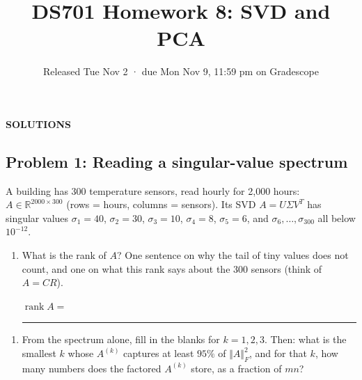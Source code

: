 \documentclass[
  11pt,
]{article}
\title{DS701 Homework 8: SVD and PCA}
\subtitle{Released Tue Nov 2 · due Mon Nov 9, 11:59 pm on Gradescope}
\author{}
\date{}
\providecommand{\tightlist}{%
  \setlength{\itemsep}{0pt}\setlength{\parskip}{0pt}}
\newcommand{\answerspace}[1]{\par\vspace*{#1}}  %
\newcommand{\blank}[1][1.2in]{\rule{#1}{0.4pt}}
\newcommand{\answerpage}{\clearpage}
\begin{document}
\maketitle


\begin{center}\LARGE\bfseries\color{blue!45!black} SOLUTIONS\end{center}
\renewcommand{\answerspace}[1]{}
\renewcommand{\answerpage}{\par\vspace{6pt}}

\subsection{Problem 1: Reading a singular-value
spectrum}\label{problem-1-reading-a-singular-value-spectrum}

A building has 300 temperature sensors, read hourly for 2,000 hours:
\(A \in \mathbb R^{2000\times300}\) (rows = hours, columns = sensors).
Its SVD \(A = U\Sigma V^T\) has singular values \(\sigma_1 = 40\),
\(\sigma_2 = 30\), \(\sigma_3 = 10\), \(\sigma_4 = 8\),
\(\sigma_5 = 6\), and \(\sigma_6,\ldots,\sigma_{300}\) all below
\(10^{-12}\).

\begin{enumerate}
\def\labelenumi{(\alph{enumi})}
\item
  What is the rank of \(A\)? One sentence on why the tail of tiny values
  does not count, and one on what this rank says about the 300 sensors
  (think of \(A = CR\)).

  \(\operatorname{rank} A =\) \blank[0.8in]
\end{enumerate}

\answerspace{0.4in}

\begin{enumerate}
\def\labelenumi{(\alph{enumi})}
\setcounter{enumi}{1}
\tightlist
\item
  From the spectrum alone, fill in the blanks for \(k = 1, 2, 3\). Then:
  what is the smallest \(k\) whose \(A^{(k)}\) captures at least
  \(95\%\) of \(\Vert A\Vert_F^2\), and for that \(k\), how many numbers
  does the factored \(A^{(k)}\) store, as a fraction of \(mn\)?
\end{enumerate}

\answerspace{0.3in}
\end{document}
